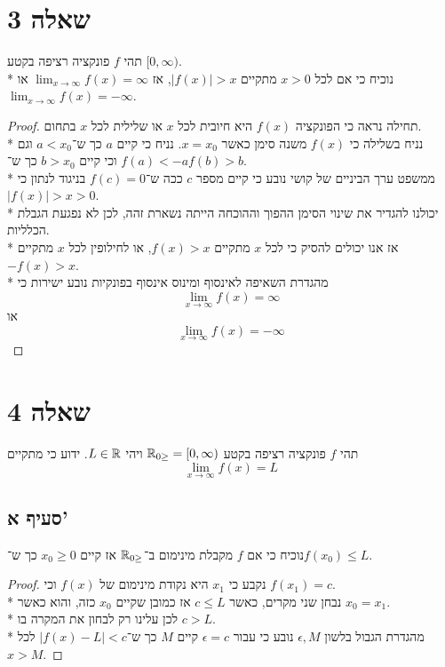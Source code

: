 \section{שאלה 3}
תהי $f$ פונקציה רציפה בקטע $[0, \infty)$. \\* %
נוכיח כי אם לכל $x > 0$ מתקיים $|f(x)| > x$, אז $\lim_{x \to \infty} f(x) = \infty$ או $\lim_{x \to \infty} f(x) = -\infty$.
\begin{proof}
	תחילה נראה כי הפונקציה $f(x)$ היא חיובית לכל $x$ או שלילית לכל $x$ בתחום. \\*
	נניח בשלילה כי $f(x)$ משנה סימן כאשר $x = x_0$.
	נניח כי קיים $a$ כך ש־$a < x_0$ וגם $f(a) < -a$ וכי קיים $b > x_0$ כך ש־$f(b) > b$. \\*
	ממשפט ערך הביניים של קושי נובע כי קיים מספר $c$ ככה ש־$f(c) = 0$ בניגוד לנתון כי $|f(x)| > x > 0$. \\*
	יכולנו להגדיר את שינוי הסימן ההפוך וההוכחה הייתה נשארת זהה, לכן לא נפגעת הגבלת הכלליות. \\*
	אז אנו יכולים להסיק כי לכל $x$ מתקיים $f(x) > x$, או לחילופין לכל $x$ מתקיים $-f(x) > x$. \\*
	מהגדרת השאיפה לאינסוף ומינוס אינסוף בפונקיות נובע ישירות כי
	\[
		\lim_{x \to \infty} f(x) = \infty
	\]
	או
	\[
		\lim_{x \to \infty} f(x) = -\infty
	\]
\end{proof}

\section{שאלה 4}
תהי $f$ פונקציה רציפה בקטע $\mathbb{R}_{0\ge} = [0, \infty)$ ויהי $L \in \mathbb{R}$. ידוע כי מתקיים %
\[
	\lim_{x \to \infty} f(x) = L
\]

\subsection{סעיף א'}
נוכיח כי אם $f$ מקבלת מינימום ב־$\mathbb{R}_{0\ge}$ אז קיים $x_0 \ge 0$ כך ש־$f(x_0) \le L$.
\begin{proof}
	נקבע כי $x_1$ היא נקודת מינימום של $f(x)$ וכי $f(x_1) = c$. \\*
	נבחן שני מקרים, כאשר $c \le L$ אז כמובן שקיים $x_0$ כזה, והוא כאשר $x_0 = x_1$. \\*
	לכן עלינו רק לבחון את המקרה בו $c > L$. \\*
	מהגדרת הגבול בלשון $\epsilon, M$ נובע כי עבור $\epsilon = c$ קיים $M$ כך ש־$|f(x) - L| < c$ לכל $x > M$.
\end{proof}

